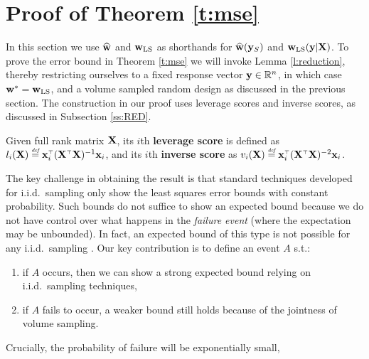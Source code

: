 \documentclass[12pt]{sty/colt2019/colt2018-arxiv}
\begin{document}
\section{Proof of Theorem \ref{t:mse}}
\label{s:proofs}
In this section we use $\widehat{\mathbf w}$ and $\mathbf w_{\mathrm{LS}}$ as shorthands for
$\widehat{\mathbf w}(\mathbf y_S)$ and $\mathbf w_{\mathrm{LS}}(\mathbf y|\mathbf X)$. %
To prove the error bound in Theorem \ref{t:mse} we will invoke Lemma
\ref{l:reduction},
thereby restricting ourselves to a fixed response vector $\mathbf y\in\mathbb R^n$,
in which case $\mathbf w^*=\mathbf w_{\mathrm{LS}}$, and a volume sampled random design
as discussed in the previous section.
The construction in our proof uses leverage scores and inverse scores, as
discussed in Subsection \ref{ss:RED}.
\begin{definition}
Given full rank matrix $\mathbf X$, its $i$th \textbf{ leverage score} is
defined as $l_i(\X)\defeq \x_i^\top(\X^\top\X)^{-1}\x_i$,
and its $i$th \textbf{inverse score} as  $v_i(\X) \defeq \x_i^\top(\X^\top\X)^{-2}\x_i$.
\end{definition}
The key challenge in obtaining the result
is that standard techniques developed for
i.i.d.~sampling \citep[see, e.g., ][]{drineas2006sampling} only show the
least squares error bounds with constant probability. 
Such bounds do not suffice to show an expected bound because
  we do not have  control over what happens in the \textit{failure 
    event} (where the expectation may be unbounded). In fact, an
  expected bound of this type is not possible 
  for any i.i.d.~sampling 
  \citep[see Proposition 11 in][]{unbiased-estimates-journal}. Our key contribution is to
  define an event $A$ s.t.:
  \begin{enumerate}
    \item if $A$ occurs, then we can show a strong expected
      bound relying on i.i.d.~sampling techniques,
    \item if $A$ fails to occur, a weaker bound still holds
      because of the jointness of volume sampling.
    \end{enumerate}
    Crucially, the probability of failure will be exponentially small,
\end{document}
